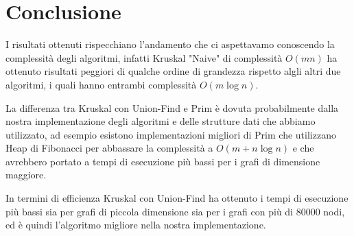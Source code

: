 \section{Conclusione}
I risultati ottenuti rispecchiano l'andamento che ci aspettavamo conoscendo la complessità degli algoritmi, infatti Kruskal "Naive" di complessità $O(mn)$ ha ottenuto risultati peggiori di qualche ordine di grandezza rispetto algli altri due algoritmi, i quali hanno entrambi complessità $O(m\log{}n)$.

La differenza tra Kruskal con Union-Find e Prim è dovuta probabilmente dalla nostra implementazione degli algoritmi e delle strutture dati che abbiamo utilizzato, ad esempio esistono implementazioni migliori di Prim che utilizzano Heap di Fibonacci per abbassare la complessità a $O(m+n\log{}n)$ e che avrebbero portato a tempi di esecuzione più bassi per i grafi di dimensione maggiore.

In termini di efficienza Kruskal con Union-Find ha ottenuto i tempi di esecuzione più bassi sia per grafi di piccola dimensione sia per i grafi con più di 80000 nodi, ed è quindi l'algoritmo migliore nella nostra implementazione. 